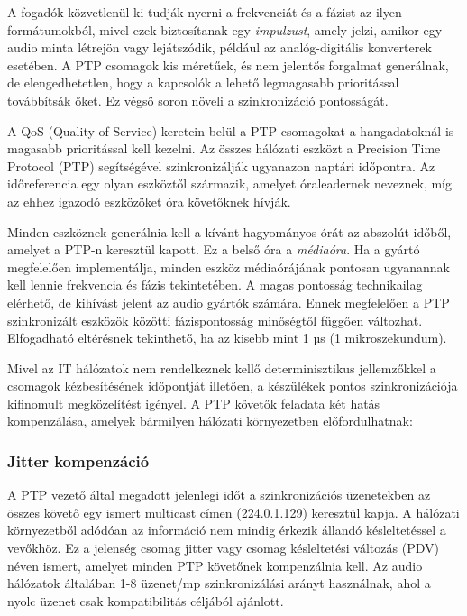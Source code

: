 A fogadók közvetlenül ki tudják nyerni a frekvenciát és a fázist az ilyen formátumokból, mivel ezek 
biztosítanak egy \textit{impulzust}, amely jelzi, amikor egy audio minta létrejön vagy lejátszódik, például 
az analóg-digitális konverterek esetében. A PTP csomagok kis méretűek, és nem jelentős forgalmat 
generálnak, de elengedhetetlen, hogy a kapcsolók a lehető legmagasabb prioritással továbbítsák őket. 
Ez végső soron növeli a szinkronizáció pontosságát.

A QoS (Quality of Service) keretein belül a PTP csomagokat a hangadatoknál is magasabb prioritással kell kezelni. 
Az összes hálózati eszközt a Precision Time Protocol (PTP) segítségével szinkronizálják ugyanazon naptári időpontra. 
Az időreferencia egy olyan eszköztől származik, amelyet óraleadernek neveznek, míg az ehhez igazodó eszközöket óra követőknek hívják.

Minden eszköznek generálnia kell a kívánt hagyományos órát az abszolút időből, amelyet a PTP-n keresztül kapott. 
Ez a belső óra a \textit{médiaóra}. Ha a gyártó megfelelően implementálja, minden eszköz médiaórájának pontosan 
ugyanannak kell lennie frekvencia és fázis tekintetében. A magas pontosság technikailag elérhető, de kihívást 
jelent az audio gyártók számára. Ennek megfelelően a PTP szinkronizált eszközök közötti fázispontosság 
minőségtől függően változhat. Elfogadható eltérésnek tekinthető, ha az kisebb mint 1 µs (1 mikroszekundum).

Mivel az IT hálózatok nem rendelkeznek kellő determinisztikus jellemzőkkel a csomagok kézbesítésének időpontját 
illetően, a készülékek pontos szinkronizációja kifinomult megközelítést igényel. 
A PTP követők feladata két hatás kompenzálása, amelyek bármilyen hálózati környezetben előfordulhatnak:
\subsubsection{Jitter kompenzáció}
A PTP vezető által megadott jelenlegi időt a szinkronizációs üzenetekben az összes
követő egy ismert multicast címen (224.0.1.129) keresztül kapja. A hálózati
környezetből adódóan az információ nem mindig érkezik állandó késleltetéssel
a vevőkhöz. Ez a jelenség csomag jitter vagy csomag késleltetési változás (PDV)
néven ismert, amelyet minden PTP követőnek kompenzálnia kell. Az audio
hálózatok általában 1-8 üzenet/mp szinkronizálási arányt használnak, ahol a
nyolc üzenet csak kompatibilitás céljából ajánlott.

